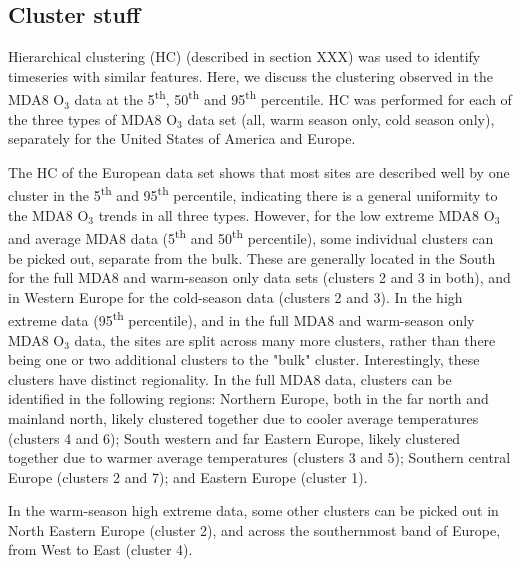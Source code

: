 \documentclass[journal abbreviation, manuscript]{copernicus}
\begin{document}
\subsection{Cluster stuff} \label{sect:cluster_stuff}
Hierarchical clustering (HC) (described in section XXX) was used to identify timeseries with similar features. Here, we discuss the clustering observed in the MDA8 O$_3$ data at the 5\textsuperscript{th}, 50\textsuperscript{th} and 95\textsuperscript{th} percentile. HC was performed for each of the three types of MDA8 O$_3$ data set (all, warm season only, cold season only), separately for the United States of America and Europe. 

The HC of the European data set shows that most sites are described well by one cluster in the 5\textsuperscript{th} and 95\textsuperscript{th} percentile, indicating there is a general uniformity to the MDA8 O$_3$ trends in all three types. However, for the low extreme MDA8 O$_3$ and average MDA8 data (5\textsuperscript{th} and 50\textsuperscript{th} percentile), some individual clusters can be picked out, separate from the bulk. These are generally located in the South for the full MDA8 and warm-season only data sets (clusters 2 and 3 in both), and in Western Europe for the cold-season data (clusters 2 and 3). In the high extreme data (95\textsuperscript{th} percentile), and in the full MDA8 and warm-season only MDA8 O$_3$ data, the sites are split across many more clusters, rather than there being one or two additional clusters to the "bulk" cluster. Interestingly, these clusters have distinct regionality. In the full MDA8 data, clusters can be identified in the following regions: Northern Europe, both in the far north and mainland north, likely clustered together due to cooler average temperatures (clusters 4 and 6); South western and far Eastern Europe, likely clustered together due to warmer average temperatures (clusters 3 and 5); Southern central Europe (clusters 2 and 7); and Eastern Europe (cluster 1). 

In the warm-season high extreme data, some other clusters can be picked out in North Eastern Europe (cluster 2), and across the southernmost band of Europe, from West to East (cluster 4).

\end{document}
